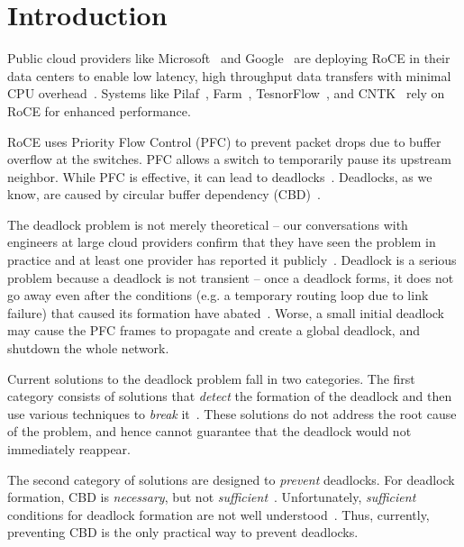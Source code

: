 \section{Introduction}
\label{sec:intro}

Public cloud providers like Microsoft~\cite{dcqcn} and Google~\cite{timely} are
deploying RoCE in their data centers to enable low latency, high throughput data
transfers with minimal CPU overhead~\cite{dcqcn}. Systems like
Pilaf~\cite{pilaf}, Farm~\cite{farm}, TesnorFlow~\cite{tensorflow}, and
CNTK~\cite{cntk} rely on RoCE for enhanced performance.

RoCE uses Priority Flow Control (PFC) to prevent packet drops due to
buffer overflow at the switches. PFC allows a switch to temporarily
pause its upstream neighbor. While PFC is effective, it can lead to
deadlocks~\cite{rdmaatscale,tcpbolt,hu2016deadlocks}. Deadlocks, as we
know, are caused by circular buffer dependency
(CBD)~\cite{hu2016deadlocks}.


The deadlock problem is not merely theoretical -- our conversations with
engineers at large cloud providers confirm that they have seen the problem in
practice and at least one provider has reported it publicly~\cite{rdmaatscale}.
Deadlock is a serious problem because a deadlock is not transient -- once a
deadlock forms, it does not go away even after the conditions (e.g. a temporary
routing loop due to link failure) that caused its formation have
abated~\cite{rdmaatscale}. Worse, a small initial deadlock may cause the PFC
frames to propagate and create a global deadlock, and shutdown the whole
network.

Current solutions to the deadlock problem fall in two categories. The first
category consists of solutions that {\em detect} the formation of the deadlock
and then use various techniques to {\em break} it~\cite{shpiner2016unlocking}.
These solutions do not address the root cause of the problem, and hence cannot
guarantee that the deadlock would not immediately reappear.

The second category of solutions are designed to {\em prevent} deadlocks.  For
deadlock formation, CBD is {\em necessary}, but not {\em
sufficient}~\cite{hu2016deadlocks}. Unfortunately, {\em sufficient} conditions
for deadlock formation are not well understood~\cite{hu2016deadlocks}. Thus,
currently, preventing CBD is the only practical way to prevent deadlocks.


